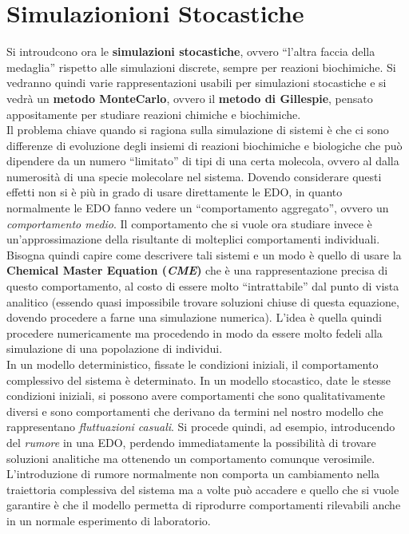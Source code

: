 \documentclass[a4paper,12pt, oneside]{book}
\begin{document}
\chapter{Simulazionioni Stocastiche}
Si introudcono ora le \textbf{simulazioni stocastiche}, ovvero ``l'altra faccia
della medaglia'' rispetto alle simulazioni discrete, sempre per reazioni
biochimiche. Si vedranno quindi varie rappresentazioni usabili per simulazioni
stocastiche e si vedrà un \textbf{metodo MonteCarlo}, ovvero il \textbf{metodo
  di Gillespie}, pensato appositamente per studiare reazioni chimiche e
biochimiche.\\
Il problema chiave quando si ragiona sulla simulazione di sistemi è che ci sono
differenze di evoluzione degli insiemi di reazioni biochimiche e biologiche che
può dipendere da un numero ``limitato'' di tipi di una certa molecola, ovvero al
dalla numerosità di una specie molecolare nel sistema. Dovendo considerare
questi effetti non si è più in grado di usare direttamente le EDO, in quanto
normalmente le EDO fanno vedere un ``comportamento aggregato'', ovvero un
\textit{comportamento medio}. Il comportamento che si vuole ora studiare invece
è un'approssimazione della risultante di molteplici comportamenti
individuali. Bisogna quindi capire come descrivere tali sistemi e un modo è
quello di usare la \textbf{Chemical Master Equation (\textit{CME})} che è una
rappresentazione precisa di questo comportamento, al costo di essere molto
``intrattabile'' dal punto di vista analitico (essendo quasi impossibile trovare
soluzioni chiuse di questa equazione, dovendo procedere a farne una simulazione
numerica). L'idea è quella quindi procedere numericamente ma procedendo in modo
da essere molto fedeli alla simulazione di una popolazione di individui.\\
In un modello deterministico, fissate le condizioni iniziali, il comportamento
complessivo del sistema è determinato. In un modello stocastico, date le stesse
condizioni iniziali, si possono avere comportamenti che sono qualitativamente
diversi e sono comportamenti che derivano da termini nel nostro modello che
rappresentano \textit{fluttuazioni casuali}. Si procede quindi, ad esempio,
introducendo del \textit{rumore} in una EDO, perdendo immediatamente la
possibilità di trovare soluzioni analitiche ma ottenendo un comportamento
comunque verosimile. L'introduzione di rumore normalmente non comporta un
cambiamento nella traiettoria complessiva del sistema ma a volte può accadere e
quello che si vuole garantire è che il modello permetta di riprodurre
comportamenti rilevabili anche in un normale esperimento di laboratorio.
\end{document}
